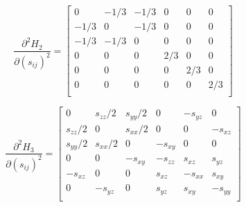 \documentclass{article}
\begin{document}
\begin{landscape}
\begin{equation}
\frac{\partial^2 H_{2}}{\partial (s_{ij})^2} = 
	\begin{bmatrix} 
	0 & -1/3 & - 1/3 & 0 & 0 & 0 \\
	-1/3 & 0 & -1/3 & 0 & 0 & 0 \\
	-1/3 & -1/3 & 0 & 0 & 0 & 0 \\
	0 & 0 & 0 & 2/3 & 0 & 0 \\
	0 & 0 & 0 & 0 & 2/3 & 0 \\
	0 & 0 & 0 & 0 & 0 & 2/3 \\
	\end{bmatrix}
\end{equation}

\begin{equation}
\frac{\partial^2 H_{3}}{\partial (s_{ij})^2} = 
	\begin{bmatrix} 
	0 & s_{zz}/2 & s_{yy}/2 & 0 & -s_{yz} & 0 \\
	s_{zz}/2 & 0 & s_{xx}/2 & 0 & 0 & -s_{xz} \\
	s_{yy}/2 & s_{xx}/2 & 0 & -s_{xy} & 0 & 0 \\
	0 & 0 & -s_{xy} & -s_{zz} & s_{xz} & s_{yz} \\
	-s_{xz} & 0 & 0 & s_{xz} & -s_{xx} & s_{xy} \\
	 0 & -s_{yz}  & 0 & s_{yz} & s_{xy} & -s_{yy} \\
	\end{bmatrix}
\end{equation}

\end{landscape}
\end{document}
